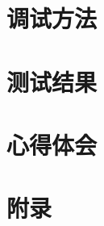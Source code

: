\documentclass[UTF8,12pt]{article}
\begin{document}
\newpage

\section{调试方法}

\newpage

\section{测试结果}

\newpage

\section{心得体会}

\newpage

\section{附录}

\newpage
\end{document}
